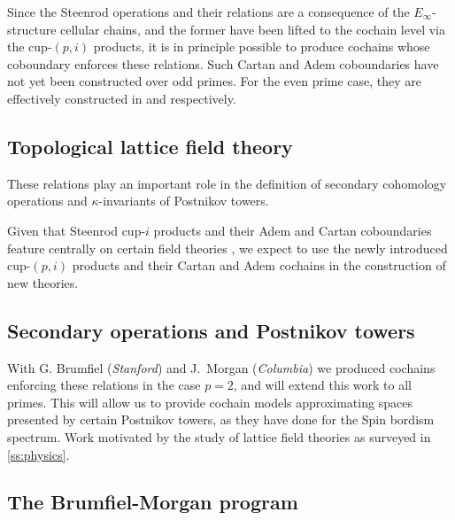 Since the Steenrod operations and their relations are a consequence of the $E_\infty$-structure cellular chains, and the former have been lifted to the cochain level via the cup-$(p,i)$ products, it is in principle possible to produce cochains whose coboundary enforces these relations.
Such Cartan and Adem coboundaries have not yet been constructed over odd primes.
For the even prime case, they are effectively constructed in \cite{medina2020cartan} and \cite{medina2021adem} respectively.

\subsection{Topological lattice field theory}


These relations play an important role in the definition of secondary cohomology operations and $\kappa$-invariants of Postnikov towers.



Given that Steenrod \mbox{cup-$i$} products and their Adem and Cartan coboundaries feature centrally on certain field theories \cite{gaiotto2016spin, kapustin2017fermionic, barkeshli2021classification}, we expect to use the newly introduced cup-$(p,i)$ products and their Cartan and Adem cochains in the construction of new theories.

\subsection{Secondary operations and Postnikov towers}



With G. Brumfiel (\textit{Stanford}) and J.~Morgan (\textit{Columbia}) we produced cochains enforcing these relations in the case $p=2$, and will extend this work to all primes.
This will allow us to provide cochain models approximating spaces presented by certain Postnikov towers, as they have done for the Spin bordism spectrum.
Work motivated by the study of lattice field theories as surveyed in \cref{ss:physics}.

\subsection{The Brumfiel-Morgan program}

